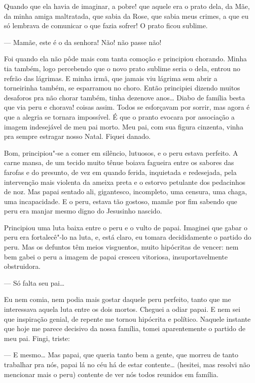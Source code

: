 Quando que ela havia de imaginar, a pobre! que aquele era o prato dela,
da Mãe, da minha amiga maltratada, que sabia da Rose, que sabia meus
crimes, a que eu só lembrava de comunicar o que fazia sofrer! O prato
ficou sublime.

--- Mamãe, este é o da senhora! Não! não passe não!

Foi quando ela não pôde mais com tanta comoção e principiou chorando.
Minha tia também, logo percebendo que o novo prato sublime seria o dela,
entrou no refrão das lágrimas. E minha irmã, que jamais viu lágrima sem
abrir a torneirinha também, se esparramou no choro. Então principiei
dizendo muitos desaforos pra não chorar também, tinha dezenove anos\ldots{}
Diabo de família besta que via peru e chorava! coisas assim. Todos se
esforçavam por sorrir, mas agora é que a alegria se tornara impossível.
É que o pranto evocara por associação a imagem indesejável de meu pai
morto. Meu pai, com sua figura cinzenta, vinha pra sempre estragar nosso
Natal. Fiquei danado.

Bom, principiou"-se a comer em silêncio, lutuosos, e o peru estava
perfeito. A carne mansa, de um tecido muito tênue boiava fagueira entre
os sabores das farofas e do presunto, de vez em quando ferida,
inquietada e redesejada, pela intervenção mais violenta da ameixa preta
e o estorvo petulante dos pedacinhos de noz. Mas papai sentado ali,
gigantesco, incompleto, uma censura, uma chaga, uma incapacidade. E o
peru, estava tão gostoso, mamãe por fim sabendo que peru era manjar
mesmo digno do Jesusinho nascido.

Principiou uma luta baixa entre o peru e o vulto de papai. Imaginei que
gabar o peru era fortalecê"-lo na luta, e, está claro, eu tomara
decididamente o partido do peru. Mas os defuntos têm meios visguentos,
muito hipócritas de vencer: nem bem gabei o peru a imagem de papai
cresceu vitoriosa, insuportavelmente obstruidora.

--- Só falta seu pai\ldots{}

Eu nem comia, nem podia mais gostar daquele peru perfeito, tanto que me
interessava aquela luta entre os dois mortos. Cheguei a odiar papai. E
nem sei que inspiração genial, de repente me tornou hipócrita e
político. Naquele instante que hoje me parece decisivo da nossa família,
tomei aparentemente o partido de meu pai. Fingi, triste:

--- E mesmo\ldots{} Mas papai, que queria tanto bem a gente, que morreu de
tanto trabalhar pra nós, papai lá no céu há de estar contente\ldots{}
(hesitei, mas resolvi não mencionar mais o peru) contente de ver nós
todos reunidos em família.

